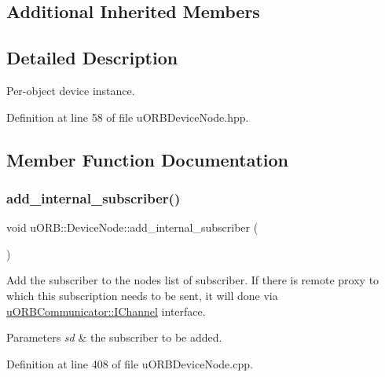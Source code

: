 \subsection*{Additional Inherited Members}


\subsection{Detailed Description}
Per-\/object device instance. 

Definition at line 58 of file u\+O\+R\+B\+Device\+Node.\+hpp.



\subsection{Member Function Documentation}
\mbox{\label{classuORB_1_1DeviceNode_abb03278ff4ddd2a50e0f2996e856f2cc}} 
\subsubsection{\texorpdfstring{add\+\_\+internal\+\_\+subscriber()}{add\_internal\_subscriber()}}
{\footnotesize\ttfamily void u\+O\+R\+B\+::\+Device\+Node\+::add\+\_\+internal\+\_\+subscriber (\begin{DoxyParamCaption}{ }\end{DoxyParamCaption})}

Add the subscriber to the node\textquotesingle{}s list of subscriber. If there is remote proxy to which this subscription needs to be sent, it will done via \hyperlink{classuORBCommunicator_1_1IChannel}{u\+O\+R\+B\+Communicator\+::\+I\+Channel} interface. 
\begin{DoxyParams}{Parameters}
{\em sd} & the subscriber to be added. \\
\hline
\end{DoxyParams}


Definition at line 408 of file u\+O\+R\+B\+Device\+Node.\+cpp.


